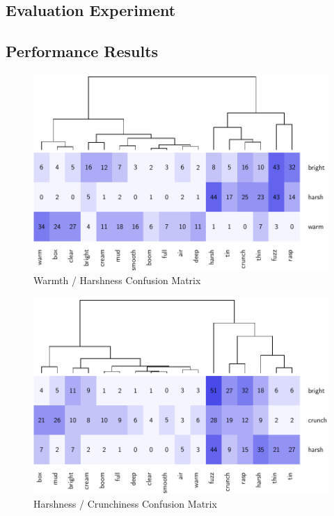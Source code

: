 	\subsection{Evaluation Experiment}
	\label{sec:PerceptualExperiments-SemanticControl-EvaluationExperiment}

	\subsection{Performance Results}
	\label{sec:PerceptualExperiments-SemanticControl-PerformanceResults}

		\begin{figure}[h!]
			\centering
			\includegraphics{chapter7/Images/HarshConfusion.pdf}
			\caption{Warmth / Harshness Confusion Matrix}
		\end{figure}

		\begin{figure}[h!]
			\centering
			\includegraphics{chapter7/Images/CrunchConfusion.pdf}
			\caption{Harshness / Crunchiness Confusion Matrix}
		\end{figure}

